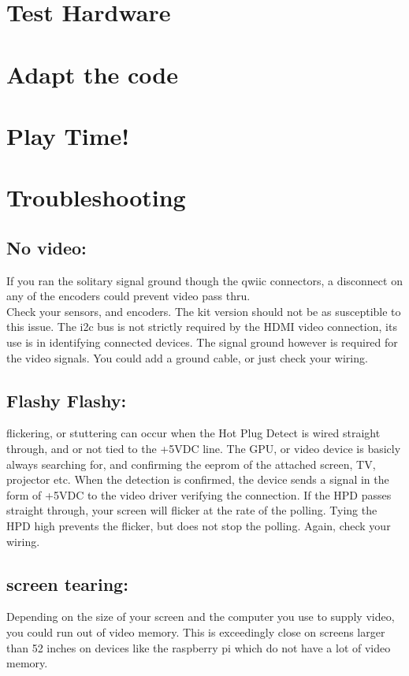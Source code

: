 \documentclass[]{article}
\begin{document}
\section*{Test Hardware}

\section*{Adapt the code}

\section*{Play Time!}

\section*{Troubleshooting}
\subsection{No video:} If you ran the solitary signal ground though the qwiic connectors, a disconnect on any of the encoders could prevent video pass thru.\\Check your sensors, and encoders. The kit version should not be as susceptible to this issue.
The i2c bus is not strictly required by the HDMI video connection, its use is in identifying connected devices. The signal ground however is required for the video signals. You could add a ground cable, or just check your wiring. 
\subsection{Flashy Flashy:} flickering, or stuttering can occur when the Hot Plug Detect is wired straight through, and or not tied to the +5VDC line. The GPU, or video device is basicly always searching for, and confirming the eeprom of the attached screen, TV, projector etc. When the detection is confirmed, the device sends a signal in the form of +5VDC to the video driver verifying the connection. If the HPD passes straight through, your screen will flicker at the rate of the polling. Tying the HPD high prevents the flicker, but does not stop the polling. Again, check your wiring.
\subsection{screen tearing:} Depending on the size of your screen and the computer you use to supply video, you could run out of video memory. This is exceedingly close on screens larger than 52 inches on devices like the raspberry pi which do not have a lot of video memory.
\end{document}
